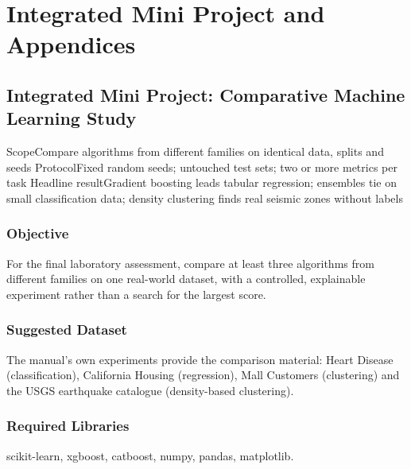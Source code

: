 
\part{Integrated Mini Project and Appendices}

\chapter*{Integrated Mini Project: Comparative Machine Learning Study}
{}
\label{exp:mini}

\quickfacts
  {Scope}{Compare algorithms from different families on identical data, splits and seeds}
  {Protocol}{Fixed random seeds; untouched test sets; two or more metrics per task}
  {Headline result}{Gradient boosting leads tabular regression; ensembles tie on small classification data; density clustering finds real seismic zones without labels}

\section{Objective}
For the final laboratory assessment, compare at least three algorithms from different
families on one real-world dataset, with a controlled, explainable experiment rather than a
search for the largest score.

\section{Suggested Dataset}
The manual's own experiments provide the comparison material: Heart Disease (classification),
California Housing (regression), Mall Customers (clustering) and the USGS earthquake
catalogue (density-based clustering).

\section{Required Libraries}
scikit-learn, xgboost, catboost, numpy, pandas, matplotlib.

